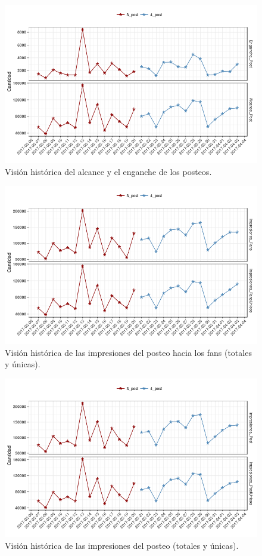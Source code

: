 \documentclass[a4paper,10pt]{article}
\begin{document}
\begin{figure}[H]
  \begin{center}
   \includegraphics[width=.75\textwidth]{imagenes/graficas/historico4.png}
   \caption{Visión histórica del alcance y el enganche de los posteos.}
  \end{center}
\end{figure}

\begin{figure}[H]
  \begin{center}
   \includegraphics[width=.75\textwidth]{imagenes/graficas/historico5.png}
   \caption{Visión histórica de las impresiones del posteo hacia los fans (totales y únicas). }
  \end{center}
\end{figure}

\begin{figure}[H]
  \begin{center}
   \includegraphics[width=.75\textwidth]{imagenes/graficas/historico6.png}
   \caption{Visión histórica de las impresiones del posteo (totales y únicas).}
  \end{center}
\end{figure}
\end{document}

